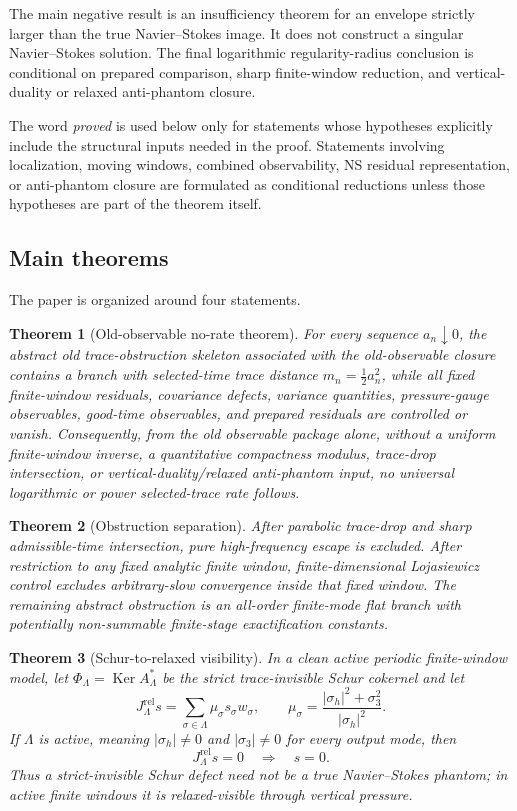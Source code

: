 \documentclass[11pt]{article}
\numberwithin{equation}{section}
\newtheorem{theorem}{Theorem}[section]
\DeclareMathOperator{\Ker}{Ker}
\newcommand{\rel}{\mathrm{rel}}
\begin{document}
The main negative result is an insufficiency theorem for an envelope strictly larger than the true Navier--Stokes image. It does not construct a singular Navier--Stokes solution. The final logarithmic regularity-radius conclusion is conditional on prepared comparison, sharp finite-window reduction, and vertical-duality or relaxed anti-phantom closure.

The word \emph{proved} is used below only for statements whose hypotheses explicitly include the structural inputs needed in the proof.  Statements involving localization, moving windows, combined observability, NS residual representation, or anti-phantom closure are formulated as conditional reductions unless those hypotheses are part of the theorem itself.

\subsection{Main theorems}
The paper is organized around four statements.

\begin{theorem}[Old-observable no-rate theorem]
For every sequence \(a_n\downarrow0\), the abstract old trace-obstruction skeleton associated with the old-observable closure contains a branch with selected-time trace distance \(m_n=\frac12 a_n^2\), while all fixed finite-window residuals, covariance defects, variance quantities, pressure-gauge observables, good-time observables, and prepared residuals are controlled or vanish. Consequently, from the old observable package alone, without a uniform finite-window inverse, a quantitative compactness modulus, trace-drop intersection, or vertical-duality/relaxed anti-phantom input, no universal logarithmic or power selected-trace rate follows.
\end{theorem}

\begin{theorem}[Obstruction separation]
After parabolic trace-drop and sharp admissible-time intersection, pure high-frequency escape is excluded. After restriction to any fixed analytic finite window, finite-dimensional Lojasiewicz control excludes arbitrary-slow convergence inside that fixed window. The remaining abstract obstruction is an all-order finite-mode flat branch with potentially non-summable finite-stage exactification constants.
\end{theorem}

\begin{theorem}[Schur-to-relaxed visibility]
In a clean active periodic finite-window model, let \(\Phi_\Lambda=\Ker A_\Lambda^*\) be the strict trace-invisible Schur cokernel and let
\[
  J^{\rel}_\Lambda s=\sum_{\sigma\in\Lambda}\mu_\sigma s_\sigma w_\sigma,
  \qquad
  \mu_\sigma=\frac{|\sigma_h|^2+\sigma_3^2}{|\sigma_h|^2}.
\]
If \(\Lambda\) is active, meaning \(|\sigma_h|\ne0\) and \(|\sigma_3|\ne0\) for every output mode, then
\[
  J^{\rel}_\Lambda s=0\quad\Longrightarrow\quad s=0.
\]
Thus a strict-invisible Schur defect need not be a true Navier--Stokes phantom; in active finite windows it is relaxed-visible through vertical pressure.
\end{theorem}
\end{document}
